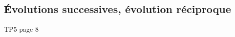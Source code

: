 \documentclass[12pt,a4paper]{article}
\begin{document}
\begin{myexs}
\end{myexs}

\newpage

\subsection{\'Evolutions successives, évolution réciproque}

TP5 page 8
\end{document}
